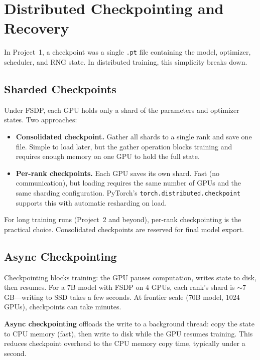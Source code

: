 \section{Distributed Checkpointing and Recovery}
\label{sec:distributed-checkpoint}

In Project~1, a checkpoint was a single \texttt{.pt} file containing the model, optimizer, scheduler, and RNG state. In distributed training, this simplicity breaks down.

\subsection{Sharded Checkpoints}

Under FSDP, each GPU holds only a shard of the parameters and optimizer states. Two approaches:

\begin{itemize}[nosep]
  \item \textbf{Consolidated checkpoint.} Gather all shards to a single rank and save one file. Simple to load later, but the gather operation blocks training and requires enough memory on one GPU to hold the full state.
  \item \textbf{Per-rank checkpoints.} Each GPU saves its own shard. Fast (no communication), but loading requires the same number of GPUs and the same sharding configuration. PyTorch's \texttt{torch.distributed.checkpoint} supports this with automatic resharding on load.
\end{itemize}

For long training runs (Project~2 and beyond), per-rank checkpointing is the practical choice. Consolidated checkpoints are reserved for final model export.

\subsection{Async Checkpointing}

Checkpointing blocks training: the GPU pauses computation, writes state to disk, then resumes. For a 7B model with FSDP on 4 GPUs, each rank's shard is $\sim$7\,GB---writing to SSD takes a few seconds. At frontier scale (70B model, 1024 GPUs), checkpoints can take minutes.

\textbf{Async checkpointing} offloads the write to a background thread: copy the state to CPU memory (fast), then write to disk while the GPU resumes training. This reduces checkpoint overhead to the CPU memory copy time, typically under a second.

